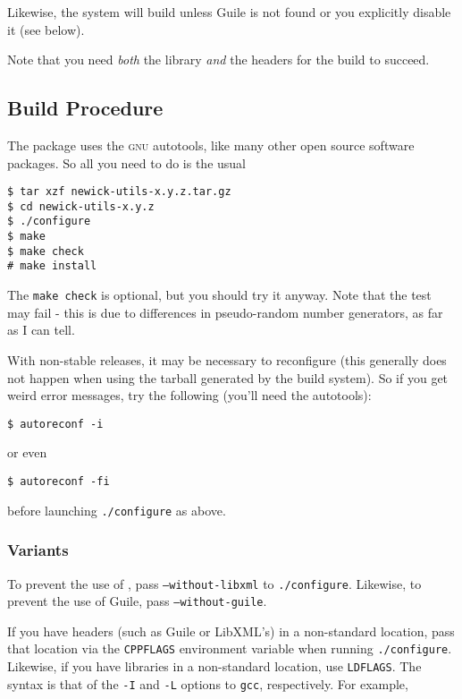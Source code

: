 Likewise, the system will build \sched{} unless Guile is
not found or you explicitly disable it (see below).

Note that you need \emph{both} the library \emph{and} the headers for the build
to succeed.

\subsection{Build Procedure}
\noindent{}The package uses the \textsc{gnu} autotools, like many other open source software packages. So all you need to do is the usual
\begin{verbatim}
$ tar xzf newick-utils-x.y.z.tar.gz
$ cd newick-utils-x.y.z
$ ./configure
$ make
$ make check
# make install
\end{verbatim}
The \texttt{make check} is optional, but you should try it anyway. Note that
the \gen{} test may fail - this is due to differences in pseudo-random number
generators, as far as I can tell.

With non-stable releases, it may be necessary to reconfigure (this generally
does not happen when using the tarball generated by the build system). So if you
get weird error messages, try the following (you'll need the \gnu{} autotools):

\begin{verbatim}
$ autoreconf -i
\end{verbatim}

or even

\begin{verbatim}
$ autoreconf -fi
\end{verbatim}

before launching \texttt{./configure} as above.

\subsubsection{Variants}

To prevent the use of \libxml, pass \texttt{--without-libxml} to
\texttt{./configure}. Likewise, to prevent the use of Guile, pass
\texttt{--without-guile}. 

If you have headers (such as Guile or LibXML's) in a non-standard location, pass
that location via the \texttt{CPPFLAGS} environment variable when running
\texttt{./configure}. Likewise, if you have libraries in a non-standard
location, use \texttt{LDFLAGS}. The syntax is that of the \texttt{-I} and
\texttt{-L} options to \texttt{gcc}, respectively. For example,


